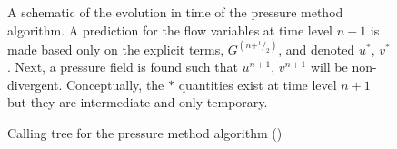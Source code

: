 \begin{figure}
\begin{center}
\end{center}
\caption{
A schematic of the evolution in time of the pressure method
algorithm. A prediction for the flow variables at time level $n+1$ is
made based only on the explicit terms, $G^{(n+^1/_2)}$, and denoted
$u^*$, $v^*$. Next, a pressure field is found such that $u^{n+1}$,
$v^{n+1}$ will be non-divergent. Conceptually, the $*$ quantities
exist at time level $n+1$ but they are intermediate and only
temporary.}
\label{fig:pressure-method-rigid-lid}
\end{figure}

\begin{figure}
\begin{center}  \end{center}
\caption{Calling tree for the pressure method algorithm 
  ()}
\label{fig:call-tree-pressure-method}
\end{figure}


